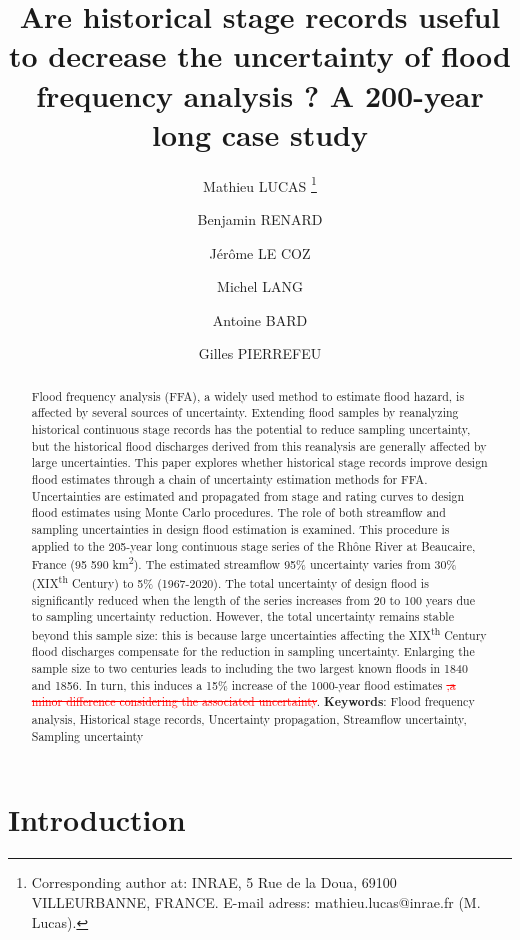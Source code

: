 \documentclass[11pt]{article}
\title{Are historical stage records useful to decrease the uncertainty of flood frequency analysis ? A 200-year long case study}
\author[1]{Mathieu LUCAS \thanks{Corresponding author at: INRAE, 5 Rue de la Doua, 69100 VILLEURBANNE, FRANCE. \newline E-mail adress: mathieu.lucas@inrae.fr (M. Lucas).}}
\author[2]{Benjamin RENARD}
\author[1]{Jérôme LE COZ}
\author[1]{Michel LANG}
\author[3]{Antoine BARD}
\author[4]{Gilles PIERREFEU}
\affil[1]{INRAE, UR RIVERLY, Villeurbanne, France}
\affil[2]{INRAE, UR RECOVER, Aix-en-Provence, France}
\affil[3]{ESDB, Briançon}
\affil[4]{CNR, Lyon}
\begin{document}
\maketitle

\begin{abstract}
    
    Flood frequency analysis (FFA), a widely used method to estimate flood hazard, is affected by several sources of uncertainty. Extending flood samples by reanalyzing historical continuous stage records has the potential to reduce sampling uncertainty, but the historical flood discharges derived from this reanalysis are generally affected by large uncertainties. This paper explores whether historical stage records improve design flood estimates through a chain of uncertainty estimation methods for FFA. Uncertainties are estimated and propagated from stage and rating curves to design flood estimates using Monte Carlo procedures. The role of both streamflow and sampling uncertainties in design flood estimation is examined. This procedure  is applied to the 205-year long continuous stage series of the Rhône River at Beaucaire, France (95 590 km\textsuperscript{2}). The estimated streamflow 95\% uncertainty varies from 30\% (XIX\textsuperscript{th} Century) to 5\% (1967-2020). The total uncertainty of design flood is significantly reduced when the length of the series increases from 20 to 100 years due to sampling uncertainty reduction. However, the total uncertainty remains stable beyond this sample size: this is because large uncertainties affecting the XIX\textsuperscript{th} Century flood discharges compensate for the reduction in sampling uncertainty. Enlarging the sample size to two centuries leads to including the two largest known floods in 1840 and 1856. In turn, this induces a 15\% increase of the 1000-year flood estimates \textcolor{red}{\sout{,a minor difference considering the associated uncertainty}}.
    \newline
    \textbf{Keywords}: Flood frequency analysis, Historical stage records, Uncertainty propagation, Streamflow uncertainty, Sampling uncertainty
        
\end{abstract}

\section{Introduction}
\end{document}
